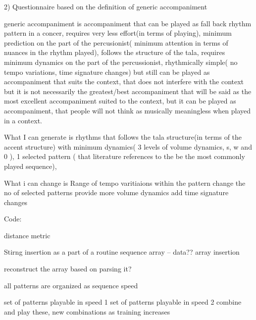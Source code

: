 2) Questionnaire based on the definition of generic accompaniment

generic accompaniment is accompaniment that can be played as fall back rhythm pattern in a concer, requires very less effort(in terms of playing), minimum prediction on the part of the percusionist( minimum attention in terms of nuances in the rhythm played), follows the structure of the tala, requires minimum dynamics on the part of the percussionist, rhythmically simple( no tempo variations, time signature changes) but still can be played as accompaniment that suits the context, that does not interfere with the context but it is not necessarily the greatest/best accompaniment that will be said as the most excellent accompaniment suited to the context, but it can be played as accompaniment, that people will not think as musically meaningless when played in a context.

What I can generate is rhythms that follows the tala structure(in terms of the accent structure) with minimum dynamics( 3 levels of volume dynamics, s, w and 0 ), 1 selected pattern ( that literature references to the be the most commonly played sequence), 

What i can change is 
Range of tempo varitiaions within the pattern 
change the no of selected patterns
provide more volume dynamics
add time signature changes




Code:


distance metric

Stirng insertion as a part of a routine sequence array -- data??
array insertion

reconstruct the array based on parsing it?

all patterns are organized as 
sequence
speed

set of patterns playable in speed 1
set of patterns playable in speed 2
combine and play these, new combinations as training increases
